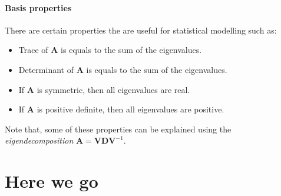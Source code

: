 \documentclass[]{book}
\providecommand{\tightlist}{%
  \setlength{\itemsep}{0pt}\setlength{\parskip}{0pt}}
\begin{document}
\hypertarget{basis-properties}{%
\subsubsection{Basis properties}\label{basis-properties}}

There are certain properties the are useful for statistical modelling such as:

\begin{itemize}
\tightlist
\item
  Trace of \(\mathbf{A}\) is equals to the sum of the eigenvalues.
\item
  Determinant of \(\mathbf{A}\) is equals to the sum of the eigenvalues.
\item
  If \(\mathbf{A}\) is symmetric, then all eigenvalues are real.
\item
  If \(\mathbf{A}\) is positive definite, then all eigenvalues are positive.
\end{itemize}

Note that, some of these properties can be explained using the \emph{eigendecomposition}
\(\mathbf{A} = \mathbf{V}\mathbf{D}\mathbf{V}^{-1}\).

\hypertarget{here-we-go}{%
\chapter{Here we go}\label{here-we-go}}


\end{document}

